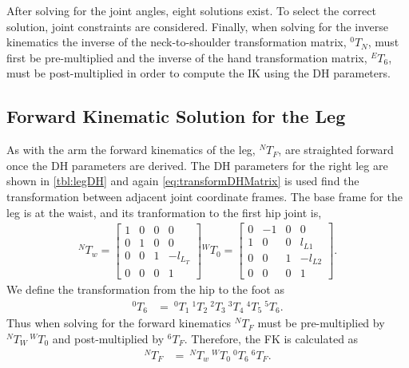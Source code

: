\documentclass[letterpaper, 10 pt, conference]{IEEEtran}
\begin{document}
After solving for the joint angles, eight solutions exist. To select the correct solution, joint constraints are considered. Finally, when solving for the inverse kinematics the inverse of the neck-to-shoulder transformation matrix, $^0T_N$, must first be pre-multiplied and the inverse of the hand transformation matrix, $^ET_6$, must be post-multiplied in order to compute the IK using the DH parameters.

\subsection{Forward Kinematic Solution for the Leg}
As with the arm the forward kinematics of the leg, $^NT_F$, are straighted forward once the DH parameters are derived. The DH parameters for the right leg are shown in \cref{tbl:legDH} and again \eqref{eq:transformDHMatrix} is used find the transformation between adjacent joint coordinate frames. The base frame for the leg is at the waist, and its tranformation to the first hip joint is,
\begin{align}\label{eq:hipTransformMatrix}
^NT_w= \begin{bmatrix}
	1 & 0 & 0 & 0 \\
	0 & 1 & 0 & 0 \\
	0 & 0 & 1 & -l_{L_T} \\
	0 & 0 & 0 & 1
\end{bmatrix}
{^WT_0} = \begin{bmatrix}
	0 & -1 & 0 & 0 \\
	1 & 0 & 0 & l_{L1} \\
	0 & 0 & 1 & -l_{L2} \\
	0 & 0 & 0 & 1
\end{bmatrix}.
\end{align}
We define the transformation from the hip to the foot as 
\begin{align} \label{eq:hipToFootTransform}
^0T_6 &=\:^0T_1\:^1T_2\:^2T_3\:^3T_4\:^4T_5\:^5T_6.
\end{align}
Thus when solving for the forward kinematics $^NT_F$ must be pre-multiplied by $^NT_W\,^WT_0$ and post-multiplied by $^6T_F$. Therefore, the FK is calculated as 
\begin{align} \label{eq:armFK}
^NT_F &=\:^NT_w\:^WT_0\:^0T_6\:^6T_F.
\end{align}
\end{document}
